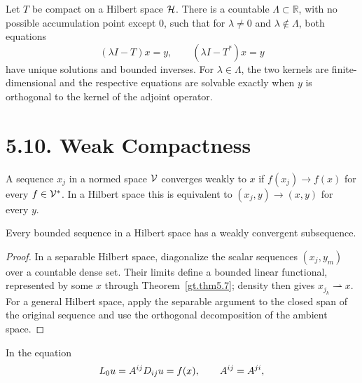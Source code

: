 \begin{theorem}\label{gt.thm5.11}

Let $T$ be compact on a Hilbert space $\Hspace$. There is a countable
$\Lambda\subset\mathbb R$, with no possible accumulation point except $0$,
such that for $\lambda\neq0$ and $\lambda\notin\Lambda$, both equations
\begin{equation}\label{gt.eq5.13}
(\lambda I-T)x=y,\qquad (\lambda I-T^*)x=y
\end{equation}
have unique solutions and bounded inverses. For $\lambda\in\Lambda$, the two
kernels are finite-dimensional and the respective equations are solvable
exactly when $y$ is orthogonal to the kernel of the adjoint operator.
\end{theorem}

\section*{5.10. Weak Compactness}

\begin{definition}\label{gt.def5.10.weak-convergence}

A sequence $x_j$ in a normed space $\V$ converges weakly to $x$ if
$f(x_j)\to f(x)$ for every $f\in\V^*$. In a Hilbert space this is equivalent
to $(x_j,y)\to(x,y)$ for every $y$.
\end{definition}

\begin{theorem}\label{gt.thm5.12}

Every bounded sequence in a Hilbert space has a weakly convergent subsequence.
\end{theorem}
\begin{proof}
\sketch In a separable Hilbert space, diagonalize the scalar sequences
$(x_j,y_m)$ over a countable dense set. Their limits define a bounded linear
functional, represented by some $x$ through Theorem~\ref{gt.thm5.7}; density
then gives $x_{j_k}\rightharpoonup x$. For a general Hilbert space, apply the
separable argument to the closed span of the original sequence and use the
orthogonal decomposition of the ambient space.
\end{proof}

\begin{lemma}\label{gt.lem6.1}
In the equation
\begin{equation}\label{gt.eq6.3}\dcref{(6.3)}\group{chapter-6}\source{gilbarg-trudinger:page-0099}
L_0u=A^{ij}D_{ij}u=f(x),\qquad A^{ij}=A^{ji},
\end{equation}
\end{lemma}
